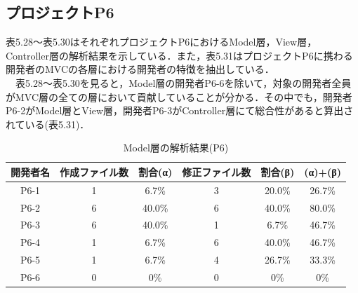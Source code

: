 \documentclass{funthesis}
\begin{document}
\subsection{プロジェクトP6}
表5.28〜表5.30はそれぞれプロジェクトP6におけるModel層，View層，Controller層の解析結果を示している．また，表5.31はプロジェクトP6に携わる開発者のMVCの各層における開発者の特徴を抽出している．
\\　表5.28〜表5.30を見ると，Model層の開発者P6-6を除いて，対象の開発者全員がMVC層の全ての層において貢献していることが分かる．その中でも，開発者P6-2がModel層とView層，開発者P6-3がController層にて総合性があると算出されている(表5.31)．
\begin{table}[H]
  \begin{center}
\begin{tabular}{|c|c|c|c|c||c|}\hline
開発者名&作成ファイル数&割合(α)&修正ファイル数&割合(β)&(α)+(β)\\ \hline
P6-1 & 1 & 6.7\% & 3 & 20.0\% & 26.7\%\\ \hline \hline
P6-2 & 6 & 40.0\% & 6 & 40.0\% & 80.0\%\\ \hline \hline
P6-3 & 6 & 40.0\% & 1 & 6.7\% & 46.7\%\\ \hline \hline
P6-4 & 1 & 6.7\% & 6 & 40.0\% & 46.7\%\\ \hline \hline
P6-5 & 1 & 6.7\% & 4 & 26.7\% & 33.3\%\\ \hline \hline
P6-6 & 0 & 0\% & 0 & 0\% & 0\%\\ \hline 
\end{tabular}    
\caption{Model層の解析結果(P6)}    \label{sample}
  \end{center}
\end{table}
\end{document}
